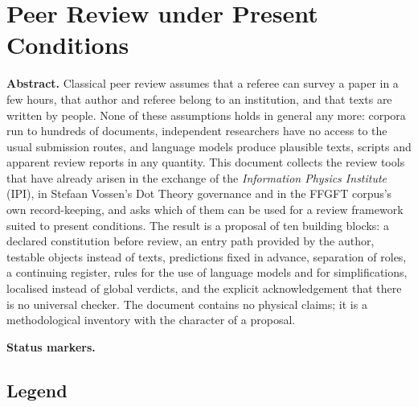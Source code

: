 
\providecommand{\BM}{\textbf{[B]}}
\providecommand{\KM}{\textbf{[K]}}
\providecommand{\SM}{\textbf{[S]}}
\providecommand{\XM}{\textbf{[X]}}
\providecommand{\QM}{\textbf{[Q]}}

\chapter*{Peer Review under Present Conditions}

{\small\noindent\textbf{Abstract.}\quad\ignorespaces
Classical peer review assumes that a referee can survey a paper in a few hours, that
author and referee belong to an institution, and that texts are written by people.
None of these assumptions holds in general any more: corpora run to hundreds of
documents, independent researchers have no access to the usual submission routes, and
language models produce plausible texts, scripts and apparent review reports in any
quantity. This document collects the review tools that have already arisen in the
exchange of the \emph{Information Physics Institute} (IPI), in Stefaan Vossen's Dot
Theory governance and in the FFGFT corpus's own record-keeping, and asks which of them
can be used for a review framework suited to present conditions. The result is a
proposal of ten building blocks: a declared constitution before review, an entry path
provided by the author, testable objects instead of texts, predictions fixed in
advance, separation of roles, a continuing register, rules for the use of language
models and for simplifications, localised instead of global verdicts, and the explicit
acknowledgement that there is no universal checker. The document contains no physical
claims; it is a methodological inventory with the character of a proposal.
}\medskip

\medskip\noindent\textbf{Status markers.}


\section*{Legend}

